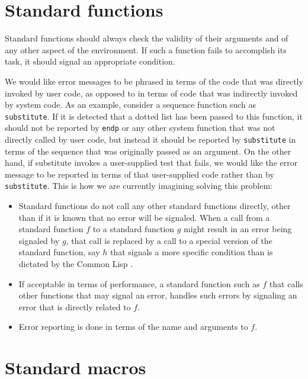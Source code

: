 \section{Standard functions}

Standard functions should always check the validity of their arguments
and of any other aspect of the environment.  If such a function fails
to accomplish its task, it should signal an appropriate condition.  

We would like error messages to be phrased in terms of the code that
was directly invoked by user code, as opposed to in terms of code that
was indirectly invoked by system code.  As an example, consider a
sequence function such as \texttt{substitute}.  If it is detected that
a dotted list has been passed to this function, it should not be
reported by \texttt{endp} or any other system function that was not
directly called by user code, but instead it should be reported by
\texttt{substitute} in terms of the sequence that was originally
passed as an argument.  On the other hand, if substitute invokes a
user-supplied test that fails, we would like the error message to be
reported in terms of that user-supplied code rather than by
\texttt{substitute}.  This is how we are currently imagining solving
this problem:

\begin{itemize}
\item Standard functions do not call any other standard functions
  directly, other than if it is known that no error will be signaled.
  When a call from a standard function $f$ to a standard function $g$
  might result in an error being signaled by $g$, that call is
  replaced by a call to a special version of the standard function,
  say $h$ that signals a more specific condition than is dictated by
  the Common Lisp \hs{}.
\item If acceptable in terms of performance, a standard function such
  as $f$ that calls other functions that may signal an error, handles
  such errors by signaling an error that is directly related to $f$. 
\item Error reporting is done in terms of the name and arguments to
  $f$. 
  
\end{itemize}

\section{Standard macros}


